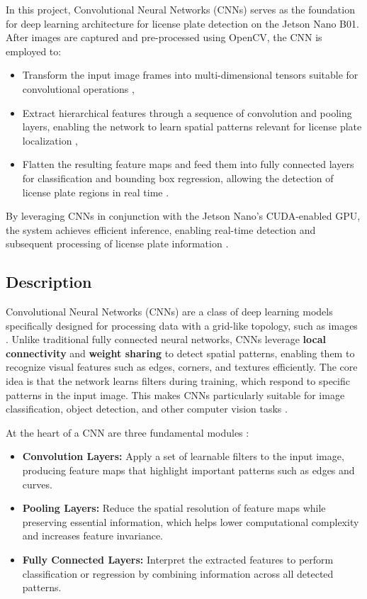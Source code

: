 In this project, Convolutional Neural Networks (CNNs) serves as the foundation for deep learning architecture for license plate detection on the Jetson Nano B01. After images are captured and pre-processed using OpenCV, the CNN is employed to:

\begin{itemize}
	\item Transform the input image frames into multi-dimensional tensors suitable for convolutional operations \cite{goodfellow2016deep},
	\item Extract hierarchical features through a sequence of convolution and pooling layers, enabling the network to learn spatial patterns relevant for license plate localization \cite{krizhevsky2012imagenet},
	\item Flatten the resulting feature maps and feed them into fully connected layers for classification and bounding box regression, allowing the detection of license plate regions in real time \cite{simonyan2014very}.
\end{itemize}



By leveraging CNNs in conjunction with the Jetson Nano’s CUDA-enabled GPU, the system achieves efficient inference, enabling real-time detection and subsequent processing of license plate information \cite{jetsonpytorch, lecun1998gradient}.

\subsection{Description}

Convolutional Neural Networks (CNNs) are a class of deep learning models specifically designed for processing data with a grid-like topology, such as images \cite{goodfellow2016deep}. Unlike traditional fully connected neural networks, CNNs leverage \textbf{local connectivity} and \textbf{weight sharing} to detect spatial patterns, enabling them to recognize visual features such as edges, corners, and textures efficiently. The core idea is that the network learns filters during training, which respond to specific patterns in the input image. This makes CNNs particularly suitable for image classification, object detection, and other computer vision tasks \cite{lecun1998gradient}.

At the heart of a CNN are three fundamental modules \cite{krizhevsky2012imagenet}:
\begin{itemize}
	\item \textbf{Convolution Layers:} Apply a set of learnable filters to the input image, producing feature maps that highlight important patterns such as edges and curves.
	\item \textbf{Pooling Layers:} Reduce the spatial resolution of feature maps while preserving essential information, which helps lower computational complexity and increases feature invariance.
	\item \textbf{Fully Connected Layers:} Interpret the extracted features to perform classification or regression by combining information across all detected patterns.
\end{itemize}


